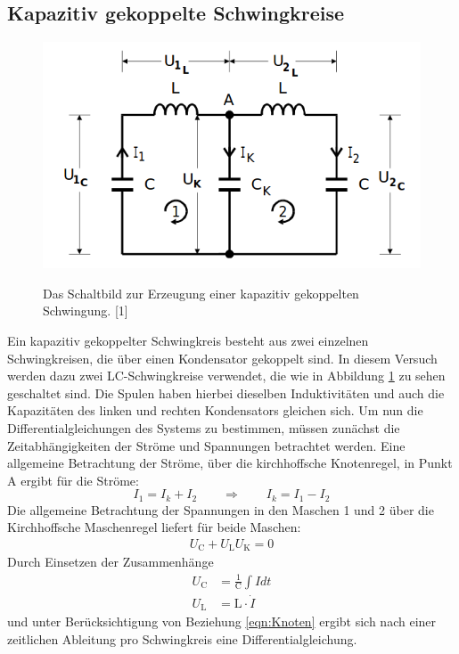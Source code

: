 \documentclass[titlepage = firstcover]{scrartcl}
\begin{document}
    \subsection{Kapazitiv gekoppelte Schwingkreise}
        \begin{figure}[h]
          \centering
          \caption{Das Schaltbild zur Erzeugung einer kapazitiv gekoppelten Schwingung. [1]}
          \includegraphics[width = 0.4\linewidth]{Schwingkreis.png}
          \label{fig:Schwingkreis}
        \end{figure}
        Ein kapazitiv gekoppelter Schwingkreis besteht aus zwei einzelnen Schwingkreisen, die über einen Kondensator gekoppelt sind. In diesem Versuch 
        werden dazu zwei LC-Schwingkreise verwendet, die wie in Abbildung \ref{fig:Schwingkreis} zu sehen geschaltet sind. Die Spulen haben hierbei dieselben Induktivitäten 
        und auch die Kapazitäten des linken und rechten Kondensators gleichen sich. Um nun die Differentialgleichungen des Systems zu bestimmen, müssen 
        zunächst die Zeitabhängigkeiten der Ströme und Spannungen betrachtet werden. Eine allgemeine Betrachtung der Ströme, über die kirchhoffsche 
        Knotenregel, in Punkt A ergibt für die Ströme:
        \begin{equation}
            I_1 = I_k + I_2 \qquad \Rightarrow \qquad I_k = I_1 - I_2
            \label{eqn:Knoten}
        \end{equation} 
        Die allgemeine Betrachtung der Spannungen in den Maschen 1 und 2 über die Kirchhoffsche Maschenregel liefert für beide Maschen:
        \begin{align*}
            U_\text{C} + U_\text{L} U_\text{K} = 0
        \end{align*}
        Durch Einsetzen der Zusammenhänge
        \begin{align*}
            U_{\text{C}} &= \frac{1}{\text{C}} \int I dt\\
            U_{\text{L}} &= \text{L} \cdot \dot{I}
        \end{align*}
        und unter Berücksichtigung von Beziehung \ref{eqn:Knoten} ergibt sich nach einer zeitlichen Ableitung pro Schwingkreis eine Differentialgleichung.
\end{document}
